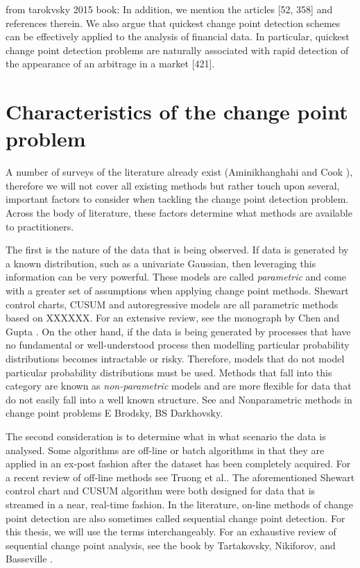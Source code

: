from tarokvsky 2015 book:
In addition, we mention the articles [52, 358] and references therein.
We also argue that quickest change point detection schemes can be effectively applied to the
analysis of financial data. In particular, quickest change point detection problems are naturally associated with rapid detection of the appearance of an arbitrage in a market [421].

\section{Characteristics of the change point problem}
A number of surveys of the literature already exist (Aminikhanghahi and Cook \cite{aminikhanghahi2017survey}), therefore we will not cover all existing methods but rather touch upon several, important factors to consider when tackling the change point detection problem. Across the body of literature, these factors determine what methods are available to practitioners. %

The first is the nature of the data that is being observed. If data is generated by a known distribution, such as a univariate Gaussian, then leveraging this information can be very powerful. These models are called \textit{parametric} and come with a greater set of assumptions when applying change point methods. Shewart control charts, CUSUM and autoregressive models are all parametric methods based on XXXXXX. For an extensive review, see the monograph by Chen and Gupta \cite{chen2011parametric}. On the other hand, if the data is being generated by processes that have no fundamental or well-understood process then modelling particular probability distributions becomes intractable or risky. Therefore, models that do not model particular probability distributions must be used. Methods that fall into this category are known as \textit{non-parametric} models and are more flexible for data that do not easily fall into a well known structure. See and Nonparametric methods in change point problems E Brodsky, BS Darkhovsky. %

The second consideration is to determine what in what scenario the data is analysed. Some algorithms are off-line or batch algorithms in that they are applied in an ex-post fashion after the dataset has been completely acquired. For a recent review of off-line methods see Truong et al.\cite{truong2018review}. The aforementioned Shewart control chart and CUSUM algorithm were both designed for data that is streamed in a near, real-time fashion. In the literature, on-line methods of change point detection are also sometimes called sequential change point detection. For this thesis, we will use the terms interchangeably. For an exhaustive review of sequential change point analysis, see the book by Tartakovsky, Nikiforov, and Basseville  \cite{tartakovsky2014sequential}. %

